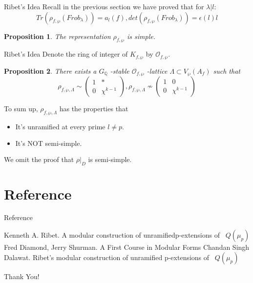 \documentclass{beamer}
\theoremstyle{plain}
\newtheorem{proposition}{Proposition}[section]
\theoremstyle{definition}
\theoremstyle{remark}
\newcommand{\Q}{\mathbb{Q}}
\newcommand{\mo}{\mathcal{O}}
\begin{document}
\begin{frame}{Ribet's Idea}
    Recall in the previous section we have proved that for $\lambda | l$:
    \[Tr(\rho_{f,\wp}(Frob_{\lambda}))=a_l(f), det(\rho_{f,\wp}(Frob_{\lambda}))=\epsilon(l)l\]
    \begin{proposition}
        The representation $\rho_{f,\wp}$ is simple.
    \end{proposition}
\end{frame}

\begin{frame}{Ribet's Idea}
    Denote the ring of integer of $K_{f,\wp}$ by $\mo_{f,\wp}$.
    \begin{proposition}
        There exists a $G_{\Q}$ -stable $\mo_{f,\wp}$ -lattice $\Lambda \subset
            V_{\wp}(A_f)$ such that
        \[\rho_{f,\wp,\Lambda} \sim \begin{pmatrix}
                1 & *           \\
                0 & \chi ^{k-1}
            \end{pmatrix},
            \rho_{f,\wp,\Lambda} \nsim \begin{pmatrix}
                1 & 0           \\
                0 & \chi ^{k-1}
            \end{pmatrix}\]
    \end{proposition}
    To sum up, $\rho_{f,\wp,\Lambda}$ has the properties that
    \begin{itemize}
        \item It's unramified at every prime $l \ne p$.
        \item It's NOT semi-simple.
    \end{itemize}
    We omit the proof that $\rho |_D$ is semi-simple.
\end{frame}

\section{Reference}
\begin{frame}{Reference}
   \begin{thebibliography}{99}
      Kenneth A. Ribet. A modular construction of unramifiedp-extensions of \ $Q(\mu_p)$
     Fred Diamond, Jerry Shurman. A First Course in Modular Forms
    Chandan Singh Dalawat. Ribet's modular construction of unramified p-extensions of \ $Q(\mu_p)$
 \end{thebibliography}
\end{frame}

\begin{frame}
    \center  Thank You!
\end{frame}
\end{document}
